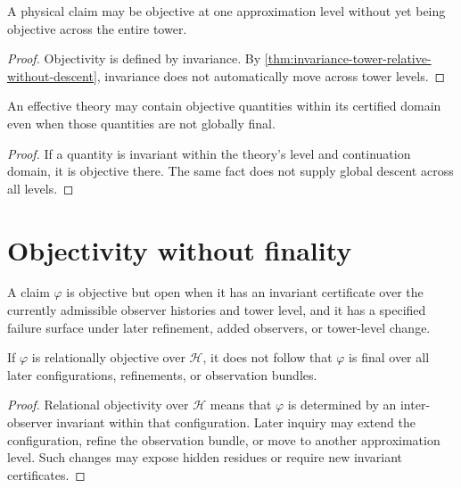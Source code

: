 \begin{corollary}
\label{cor:objectivity-level-relative-unless-descent}
A physical claim may be objective at one approximation level without yet being objective across the entire tower.
\end{corollary}

\begin{proof}
Objectivity is defined by invariance. By \autoref{thm:invariance-tower-relative-without-descent}, invariance does not automatically move across tower levels.
\end{proof}

\begin{corollary}
\label{cor:effective-objectivity-legitimate-local}
An effective theory may contain objective quantities within its certified domain even when those quantities are not globally final.
\end{corollary}

\begin{proof}
If a quantity is invariant within the theory's level and continuation domain, it is objective there. The same fact does not supply global descent across all levels.
\end{proof}

\section{Objectivity without finality}
\label{sec:objectivity-without-finality}

\begin{definition}
\label{def:objective-but-open-claim}
A claim $\varphi$ is objective but open when it has an invariant certificate over the currently admissible observer histories and tower level, and it has a specified failure surface under later refinement, added observers, or tower-level change.
\end{definition}

\begin{theorem}
\label{thm:objectivity-does-not-imply-finality}
If $\varphi$ is relationally objective over $\mathcal H$, it does not follow that $\varphi$ is final over all later configurations, refinements, or observation bundles.
\end{theorem}

\begin{proof}
Relational objectivity over $\mathcal H$ means that $\varphi$ is determined by an inter-observer invariant within that configuration. Later inquiry may extend the configuration, refine the observation bundle, or move to another approximation level. Such changes may expose hidden residues or require new invariant certificates.
\end{proof}

